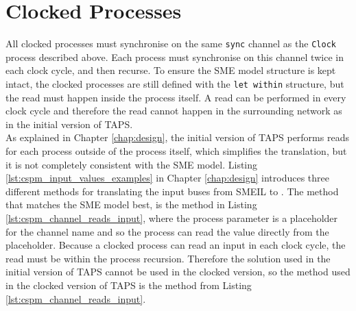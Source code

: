 \section{Clocked Processes}
All clocked processes must synchronise on the same \texttt{sync} channel as the \texttt{Clock} process described above. Each process must synchronise on this channel twice in each clock cycle, and then recurse. To ensure the SME model structure is kept intact, the clocked processes are still defined with the \texttt{let within} structure, but the read must happen inside the process itself. A read can be performed in every clock cycle and therefore the read cannot happen in the surrounding network as in the initial version of TAPS.\\

As explained in Chapter \ref{chap:design}, the initial version of TAPS performs reads for each process outside of the process itself, which simplifies the translation, but it is not completely consistent with the SME model. Listing \ref{lst:cspm_input_values_examples} in Chapter \ref{chap:design} introduces three different methods for translating the input buses from SMEIL to \cspm{}. The method that matches the SME model best, is the method in Listing \ref{lst:cspm_channel_reads_input}, where the process parameter is a placeholder for the channel name and so the process can read the value directly from the placeholder. Because a clocked process can read an input in each clock cycle, the read must be within the process recursion. Therefore the solution used in the initial version of TAPS cannot be used in the clocked version, so the method used in the clocked version of TAPS is the method from Listing \ref{lst:cspm_channel_reads_input}.\\

